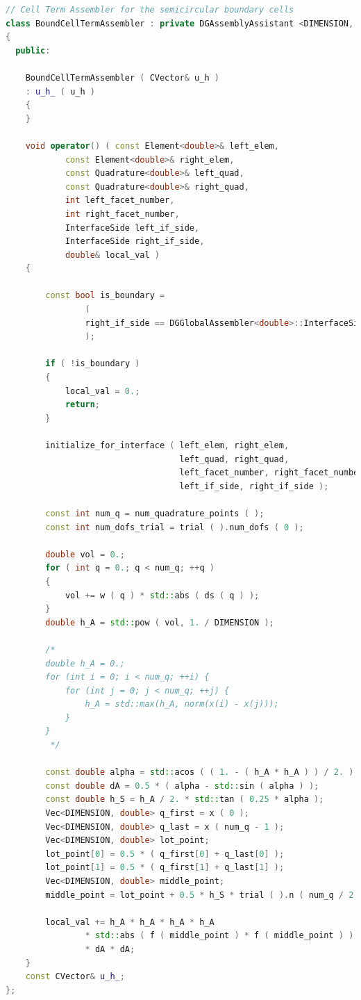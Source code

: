 \documentclass[a4paper, 11pt, twoside]{article}
\begin{document}
\begin{lstlisting}[language=C++, basicstyle={\footnotesize, \ttfamily}, keywordstyle=\color{blue}, numbers=none, tabsize=4]
// Cell Term Assembler for the semicircular boundary cells
class BoundCellTermAssembler : private DGAssemblyAssistant <DIMENSION, double>
{
  public:

    BoundCellTermAssembler ( CVector& u_h )
    : u_h_ ( u_h )
    {
    }

    void operator() ( const Element<double>& left_elem,
            const Element<double>& right_elem,
            const Quadrature<double>& left_quad,
            const Quadrature<double>& right_quad,
            int left_facet_number,
            int right_facet_number,
            InterfaceSide left_if_side,
            InterfaceSide right_if_side,
            double& local_val )
    {

        const bool is_boundary =
                (
                right_if_side == DGGlobalAssembler<double>::InterfaceSide::BOUNDARY
                );

        if ( !is_boundary )
        {
            local_val = 0.;
            return;
        }

        initialize_for_interface ( left_elem, right_elem,
                                   left_quad, right_quad,
                                   left_facet_number, right_facet_number,
                                   left_if_side, right_if_side );

        const int num_q = num_quadrature_points ( );
        const int num_dofs_trial = trial ( ).num_dofs ( 0 );

        double vol = 0.;
        for ( int q = 0.; q < num_q; ++q )
        {
            vol += w ( q ) * std::abs ( ds ( q ) );
        }
        double h_A = std::pow ( vol, 1. / DIMENSION );

        /*
        double h_A = 0.;
        for (int i = 0; i < num_q; ++i) {
            for (int j = 0; j < num_q; ++j) {
                h_A = std::max(h_A, norm(x(i) - x(j)));
            }
        }
         */

        const double alpha = std::acos ( ( 1. - ( h_A * h_A ) ) / 2. );
        const double dA = 0.5 * ( alpha - std::sin ( alpha ) );
        const double h_S = h_A / 2. * std::tan ( 0.25 * alpha );
        Vec<DIMENSION, double> q_first = x ( 0 );
        Vec<DIMENSION, double> q_last = x ( num_q - 1 );
        Vec<DIMENSION, double> lot_point;
        lot_point[0] = 0.5 * ( q_first[0] + q_last[0] );
        lot_point[1] = 0.5 * ( q_first[1] + q_last[1] );
        Vec<DIMENSION, double> middle_point;
        middle_point = lot_point + 0.5 * h_S * trial ( ).n ( num_q / 2 );

        local_val += h_A * h_A * h_A * h_A
                * std::abs ( f ( middle_point ) * f ( middle_point ) )
                * dA * dA;
    }
    const CVector& u_h_;
};

\end{lstlisting}
\end{document}
